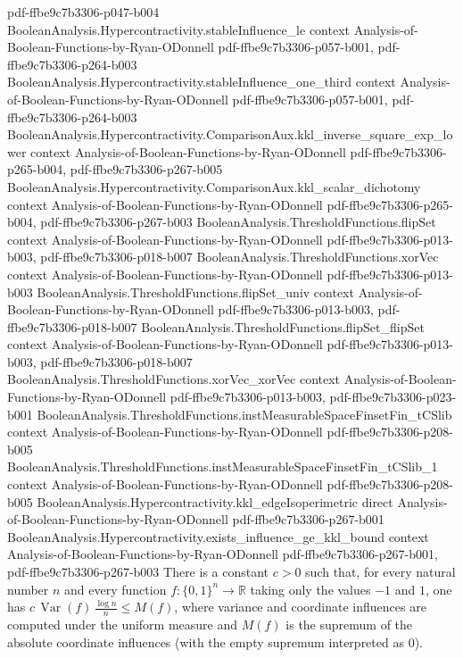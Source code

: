 \begin{theorem}
{    pdf-ffbe9c7b3306-p047-b004}
\proofstep
  {BooleanAnalysis.Hypercontractivity.stableInfluence_le}
  {context}
  {Analysis-of-Boolean-Functions-by-Ryan-ODonnell}
  {pdf-ffbe9c7b3306-p057-b001,
    pdf-ffbe9c7b3306-p264-b003}
\proofstep
  {BooleanAnalysis.Hypercontractivity.stableInfluence_one_third}
  {context}
  {Analysis-of-Boolean-Functions-by-Ryan-ODonnell}
  {pdf-ffbe9c7b3306-p057-b001,
    pdf-ffbe9c7b3306-p264-b003}
\proofstep
  {BooleanAnalysis.Hypercontractivity.ComparisonAux.kkl_inverse_square_exp_lower}
  {context}
  {Analysis-of-Boolean-Functions-by-Ryan-ODonnell}
  {pdf-ffbe9c7b3306-p265-b004,
    pdf-ffbe9c7b3306-p267-b005}
\proofstep
  {BooleanAnalysis.Hypercontractivity.ComparisonAux.kkl_scalar_dichotomy}
  {context}
  {Analysis-of-Boolean-Functions-by-Ryan-ODonnell}
  {pdf-ffbe9c7b3306-p265-b004,
    pdf-ffbe9c7b3306-p267-b003}
\proofstep
  {BooleanAnalysis.ThresholdFunctions.flipSet}
  {context}
  {Analysis-of-Boolean-Functions-by-Ryan-ODonnell}
  {pdf-ffbe9c7b3306-p013-b003,
    pdf-ffbe9c7b3306-p018-b007}
\proofstep
  {BooleanAnalysis.ThresholdFunctions.xorVec}
  {context}
  {Analysis-of-Boolean-Functions-by-Ryan-ODonnell}
  {pdf-ffbe9c7b3306-p013-b003}
\proofstep
  {BooleanAnalysis.ThresholdFunctions.flipSet_univ}
  {context}
  {Analysis-of-Boolean-Functions-by-Ryan-ODonnell}
  {pdf-ffbe9c7b3306-p013-b003,
    pdf-ffbe9c7b3306-p018-b007}
\proofstep
  {BooleanAnalysis.ThresholdFunctions.flipSet_flipSet}
  {context}
  {Analysis-of-Boolean-Functions-by-Ryan-ODonnell}
  {pdf-ffbe9c7b3306-p013-b003,
    pdf-ffbe9c7b3306-p018-b007}
\proofstep
  {BooleanAnalysis.ThresholdFunctions.xorVec_xorVec}
  {context}
  {Analysis-of-Boolean-Functions-by-Ryan-ODonnell}
  {pdf-ffbe9c7b3306-p013-b003,
    pdf-ffbe9c7b3306-p023-b001}
\proofstep
  {BooleanAnalysis.ThresholdFunctions.instMeasurableSpaceFinsetFin_tCSlib}
  {context}
  {Analysis-of-Boolean-Functions-by-Ryan-ODonnell}
  {pdf-ffbe9c7b3306-p208-b005}
\proofstep
  {BooleanAnalysis.ThresholdFunctions.instMeasurableSpaceFinsetFin_tCSlib_1}
  {context}
  {Analysis-of-Boolean-Functions-by-Ryan-ODonnell}
  {pdf-ffbe9c7b3306-p208-b005}
\proofstep
  {BooleanAnalysis.Hypercontractivity.kkl_edgeIsoperimetric}
  {direct}
  {Analysis-of-Boolean-Functions-by-Ryan-ODonnell}
  {pdf-ffbe9c7b3306-p267-b001}
\proofstep
  {BooleanAnalysis.Hypercontractivity.exists_influence_ge_kkl_bound}
  {context}
  {Analysis-of-Boolean-Functions-by-Ryan-ODonnell}
  {pdf-ffbe9c7b3306-p267-b001,
    pdf-ffbe9c7b3306-p267-b003}
There is a constant $c>0$ such that, for every natural number $n$ and every function
$f:\{0,1\}^n\to\mathbb R$ taking only the values $-1$ and $1$, one has
$c\,\operatorname{Var}(f)\,\frac{\log n}{n}\le M(f)$, where variance and coordinate
influences are computed under the uniform measure and $M(f)$ is the supremum of the
absolute coordinate influences (with the empty supremum interpreted as $0$).
\end{theorem}

